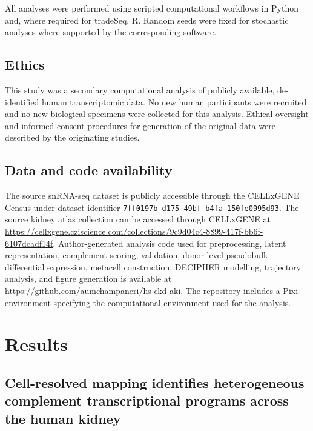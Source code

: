 \documentclass[10pt,letterpaper]{article}
\begin{document}
All analyses were performed using scripted computational workflows in Python and, where required for tradeSeq, R. Random seeds were fixed for stochastic analyses where supported by the corresponding software.

\subsection*{Ethics}

This study was a secondary computational analysis of publicly available, de-identified human transcriptomic data. No new human participants were recruited and no new biological specimens were collected for this analysis. Ethical oversight and informed-consent procedures for generation of the original data were described by the originating studies.

\subsection*{Data and code availability}

The source snRNA-seq dataset is publicly accessible through the CELLxGENE Census under dataset identifier \texttt{7ff0197b-d175-49bf-b4fa-150fe0995d93}. The source kidney atlas collection can be accessed through CELLxGENE at \href{https://cellxgene.cziscience.com/collections/9c9d04c4-8899-417f-bb6f-6107dcadf14f}{https://cellxgene.cziscience.com/collections/9c9d04c4-8899-417f-bb6f-6107dcadf14f}. Author-generated analysis code used for preprocessing, latent representation, complement scoring, validation, donor-level pseudobulk differential expression, metacell construction, DECIPHER modelling, trajectory analysis, and figure generation is available at \href{https://github.com/aumchampaneri/hs-ckd-aki}{https://github.com/aumchampaneri/hs-ckd-aki}. The repository includes a Pixi environment specifying the computational environment used for the analysis.



\section*{Results}

\subsection*{Cell-resolved mapping identifies heterogeneous complement transcriptional programs across the human kidney}
\end{document}
